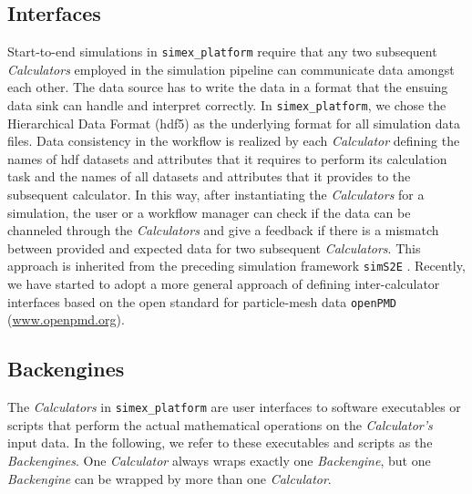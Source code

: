 \documentclass[12pt]{scrartcl}
\begin{document}
\subsection{Interfaces}
Start-to-end simulations in \texttt{simex\_platform} require that any two
subsequent \textit{Calculators} employed in the simulation pipeline can
communicate data amongst each other. The data source has to write the data in a
format that the ensuing data sink can handle and interpret correctly. In
\texttt{simex\_platform}, we chose the Hierarchical Data Format (hdf5) \cite{HDFGroup1997}
as the underlying format for all simulation data files.  Data consistency in the
workflow is realized by each \textit{Calculator} defining the names of hdf
datasets and attributes that it requires to perform its calculation task and the
names of all datasets and attributes that it provides to the subsequent
calculator. In this way, after instantiating the \textit{Calculators} for a
simulation, the user or a workflow manager can check if the data can be
channeled through the \textit{Calculators} and give a feedback if there is a
mismatch between provided and expected data for two subsequent
\textit{Calculators}. This approach is inherited from the preceding simulation
framework \texttt{simS2E} \cite{Yoon2016, simS2Edoc}. Recently, we have started
to adopt a more general approach of defining inter-calculator interfaces based
on the open standard for particle-mesh data \texttt{openPMD}
(\url{www.openpmd.org}).


\subsection{Backengines}
The \textit{Calculators} in \texttt{simex\_platform} are user interfaces to
software executables or scripts that perform the actual mathematical operations on the
\textit{Calculator's} input data. In the following, we refer to these
executables and scripts as the \textit{Backengines}. One \textit{Calculator}
always wraps exactly one \textit{Backengine}, but one \textit{Backengine} can be
wrapped by more than one \textit{Calculator}.
\end{document}
